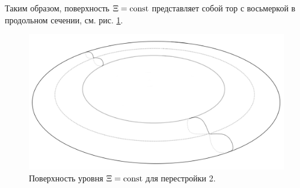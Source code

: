 Таким образом, поверхность $\Xi = \mathrm{const}$ представляет собой тор с восьмеркой в продольном сечении, см. рис. \ref{fig:pt9:_foc_ell_atom}.
\begin{figure}[!htb]
\centering
\includegraphics[scale=0.125]{images/section2/atoms/foc_ell_atom.pdf}
\caption{Поверхность уровня $\Xi = \mathrm{const}$ для перестройки 2.}
\label{fig:pt9:_foc_ell_atom}
\end{figure}

 
%

